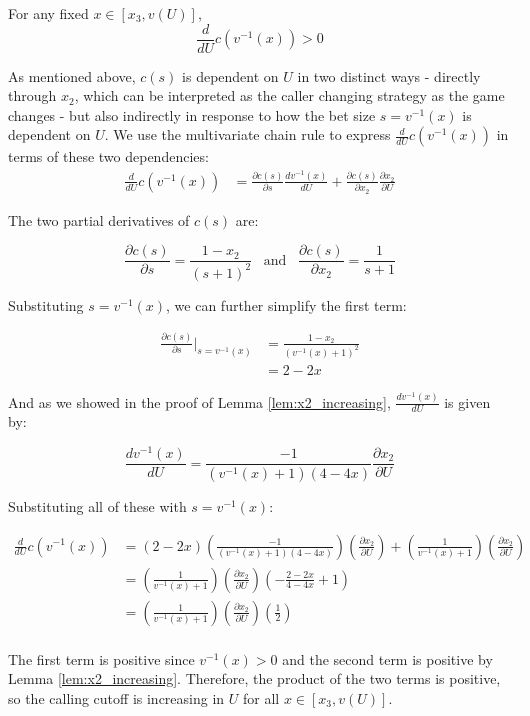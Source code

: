 \documentclass[../../main/main.tex]{subfiles}
\begin{document}
\begin{lemma}
    \label{lem:c_increasing}
    For any fixed $x \in [x_3, v(U)]$, 
    \[ 
        \frac{d}{dU} c(v^{-1}(x)) > 0
    \]
\end{lemma}

\begin{customproof}
    As mentioned above, $c(s)$ is dependent on $U$ in two distinct ways -  directly through $x_2$, which can be interpreted as the caller changing strategy as the game changes - but also indirectly in response to how the bet size $s = v^{-1}(x)$ is dependent on $U$. We use the multivariate chain rule to express $\frac{d}{dU} c(v^{-1}(x))$ in terms of these two dependencies:
    \begin{align*}
        \frac{d}{dU} c(v^{-1}(x)) & = \frac{\partial c(s)}{\partial s} \frac{d v^{-1}(x)}{d U} + \frac{\partial c(s)}{\partial x_2} \frac{\partial x_2}{\partial U}
    \end{align*}
    
    The two partial derivatives of $c(s)$ are:

    $$ \frac{\partial c(s)}{\partial s} = \frac{1-x_2}{(s+1)^2} \; \; \; \text{and} \; \; \; \frac{\partial c(s)}{\partial x_2} = \frac{1}{s+1} $$

    Substituting $s = v^{-1}(x)$, we can further simplify the first term:

    \begin{align*}
        \frac{\partial c(s)}{\partial s} \bigg|_{s=v^{-1}(x)} & = \frac{1-x_2}{(v^{-1}(x)+1)^2} \\
        & = 2-2x
    \end{align*}

    And as we showed in the proof of Lemma \ref{lem:x2_increasing}, $\frac{d v^{-1}(x)}{d U}$ is given by:

    $$ \frac{d v^{-1}(x)}{d U} = \frac{-1}{(v^{-1}(x)+1)(4-4x)} \frac{\partial x_2}{\partial U} $$

    Substituting all of these with $s = v^{-1}(x)$:

    \begin{align*}
        \frac{d}{dU} c(v^{-1}(x)) & = 
        \left(2-2x\right) 
        \left(\frac{-1}{(v^{-1}(x)+1)(4-4x)}\right) 
        \left(\frac{\partial x_2}{\partial U}\right) 
        + \left(\frac{1}{v^{-1}(x)+1}\right) 
        \left(\frac{\partial x_2}{\partial U}\right)\\
        & = \left( \frac{1}{v^{-1}(x)+1} \right) 
        \left( \frac{\partial x_2}{\partial U} \right)
        \left( -\frac{2-2x}{4-4x} + 1\right) \\
        & = \left( \frac{1}{v^{-1}(x)+1} \right) 
        \left( \frac{\partial x_2}{\partial U} \right)
        \left( \frac{1}{2} \right) \\
    \end{align*}

    The first term is positive since $v^{-1}(x) > 0$ and the second term is positive by Lemma \ref{lem:x2_increasing}. Therefore, the product of the two terms is positive, so the calling cutoff is increasing in $U$ for all $x \in [x_3, v(U)]$.

\end{customproof}
\end{document}
